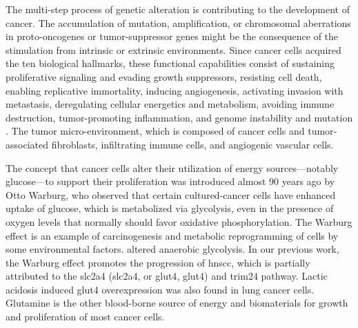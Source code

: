 \documentclass[12pt, a4paper]{article}
\begin{document}
The multi-step process of genetic alteration is contributing to the development of cancer. The accumulation of mutation, amplification, or chromosomal aberrations in proto-oncogenes or tumor-suppressor genes might be the consequence of the stimulation from intrinsic or extrinsic environments.
Since cancer cells acquired the ten biological hallmarks, these functional capabilities consist of sustaining proliferative signaling and evading growth suppressors, resisting cell death, enabling replicative immortality, inducing angiogenesis, activating invasion with metastasis, deregulating cellular energetics and metabolism, avoiding immune destruction, tumor-promoting inflammation, and genome instability and mutation \citep{Hanahan2000, Hanahan2011, Hanahan2017}. The tumor micro-environment, which is composed of cancer cells and tumor‐associated fibroblasts, infiltrating immune cells, and angiogenic vascular cells.

\begin{outline}
\1 
\end{outline}

The concept that cancer cells alter their utilization of energy sources—notably glucose—to support their proliferation was introduced almost 90 years ago by Otto Warburg, who observed that certain cultured-cancer cells have enhanced uptake of glucose, which is metabolized via glycolysis, even in the presence of oxygen levels that normally should favor oxidative phosphorylation.
The Warburg effect\citep{Warburg1956} is an example of carcinogenesis and metabolic reprogramming of cells by some environmental factors.
altered anaerobic glycolysis. 
In our previous work\citep{Chang2017b}, the Warburg effect promotes the progression of \acrshort{hnscc}, which is partially attributed to the \acrlong{slc2a4} (\acrshort{slc2a4}, or \acrlong{glut4}, \acrshort{glut4}) and \acrfull{trim24} pathway\citep{Chang2017b}\citep{Mani2020}.
Lactic acidosis induced \acrshort{glut4} overexpression was also found in lung cancer cells\citep{Prado-Garcia2020}. 
Glutamine is the other blood-borne source of energy and biomaterials for growth and proliferation of most cancer cells\citep{Hanahan2017}.



\end{document}
